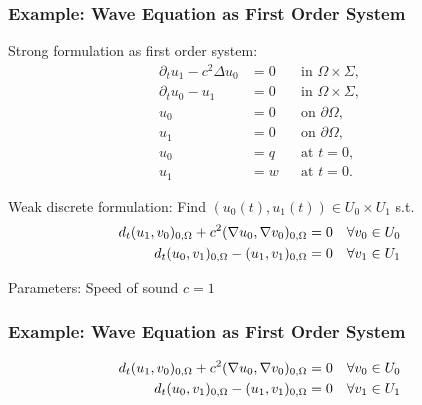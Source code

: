 \documentclass[aspectratio=169,11pt]{beamer}
\theoremstyle{definition}
\begin{document}
\begin{frame}
  \frametitle{Example: Wave Equation as First Order System}
  Strong formulation as first order system:
  \begin{subequations}
    \label{eq:SystemForm1}
    \begin{align*}
      \partial_t u_1 - c^2\Delta u_0 &=0 &&\text{in $\Omega\times\Sigma$},\\
      \partial_t u_0 - u_1 &=0 &&\text{in $\Omega\times\Sigma$},\\
      u_0 &= 0 &&\text{on $\partial\Omega$},\\
      u_1 &= 0 &&\text{on $\partial\Omega$},\\
      u_0 &= q &&\text{at $t=0$},\\
      u_1 &= w &&\text{at $t=0$}.
    \end{align*}
  \end{subequations}

  Weak discrete formulation: Find $(u_0(t),u_1(t))\in U_0\times U_1$ s.t.
  \begin{align*}
    d_t (u_1,v_0)_{0,\Omega} + c^2 (\nabla u_0, \nabla v_0)_{0,\Omega}
    &= 0 \quad \forall v_0 \in U_0 \notag \\
    d_t (u_0,v_1)_{0,\Omega} - (u_1,v_1)_{0,\Omega}
    &= 0 \quad \forall v_1 \in U_1
  \end{align*}

  Parameters: Speed of sound $c=1$
\end{frame}

\begin{frame}[fragile]
  \frametitle{Example: Wave Equation as First Order System}

  \begin{align*}
    d_t (u_1,v_0)_{0,\Omega} + c^2 (\nabla u_0, \nabla v_0)_{0,\Omega}
    &= 0 \quad \forall v_0 \in U_0 \notag \\
    d_t (u_0,v_1)_{0,\Omega} - (u_1,v_1)_{0,\Omega}
    &= 0 \quad \forall v_1 \in U_1
  \end{align*}

  
\end{frame}
\end{document}

